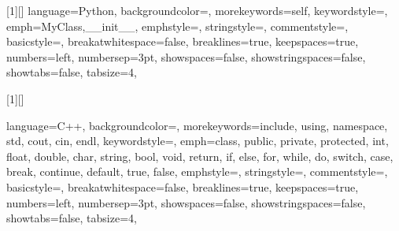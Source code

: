 
\usepackage{amsmath}
\usepackage{graphicx}
\usepackage{amssymb}
\usepackage{listings}
\usepackage{float}
\usepackage{color}
\usepackage{xcolor}



\newcommand\pythonstyle
{\lstset
    {
        language=Python,
        backgroundcolor=\color{backcolour},
        morekeywords={self},
        keywordstyle=\ttfamily\color{deepblue},
        emph={MyClass,__init__},
        emphstyle=\ttfamily\color{deepred},
        stringstyle=\color{deepgreen},
        commentstyle=\color{codegreen},
        basicstyle=\ttfamily\footnotesize,
        breakatwhitespace=false,
        breaklines=true,
        keepspaces=true,
        numbers=left,
        numbersep=3pt,
        showspaces=false,
        showstringspaces=false,
        showtabs=false,
        tabsize=4,
    }
}

\newcommand\cppstyle
{\lstset
    {
        language=C++,
        backgroundcolor=\color{backcolour},
        morekeywords={include, using, namespace, std, cout, cin, endl},
        keywordstyle=\ttfamily\color{deepblue},
        emph={class, public, private, protected, int, float, double, char, string, bool, void, return, if, else, for, while, do, switch, case, break, continue, default, true, false},
        emphstyle=\ttfamily\color{deepred},
        stringstyle=\color{deepgreen},
        commentstyle=\color{codegreen},
        basicstyle=\ttfamily\footnotesize,
        breakatwhitespace=false,
        breaklines=true,
        keepspaces=true,
        numbers=left,
        numbersep=3pt,
        showspaces=false,
        showstringspaces=false,
        showtabs=false,
        tabsize=4,
    }
}

[1][]
    {\lstset
    {
        language=Python,
        backgroundcolor=\color{backcolour},
        morekeywords={self},
        keywordstyle=\ttfamily\color{deepblue},
        emph={MyClass,__init__},
        emphstyle=\ttfamily\color{deepred},
        stringstyle=\color{deepgreen},
        commentstyle=\color{codegreen},
        basicstyle=\ttfamily\footnotesize,
        breakatwhitespace=false,
        breaklines=true,
        keepspaces=true,
        numbers=left,
        numbersep=3pt,
        showspaces=false,
        showstringspaces=false,
        showtabs=false,
        tabsize=4,
    }
    }
{}

[1][]
{
\cppstyle
\lstset{#1}
}
{}

\newcommand\pythoninline[1]{{\pythonstyle\lstinline!#1!}}
\newcommand\cppinline[1]{{\cppstyle\lstinline!#1!}}